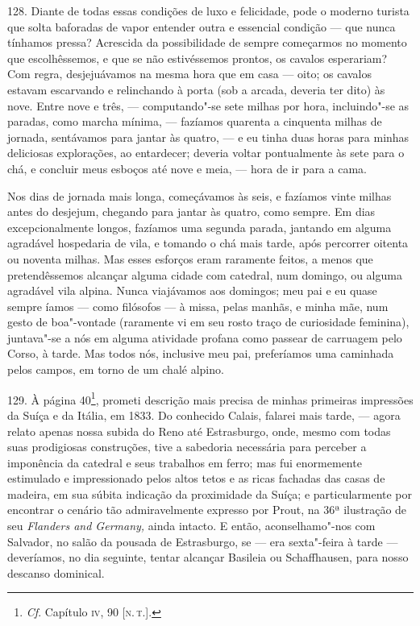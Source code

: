 128. Diante de todas essas condições de luxo e felicidade, pode o
moderno turista que solta baforadas de vapor entender outra e essencial
condição --- que nunca tínhamos pressa? Acrescida da possibilidade de
sempre começarmos no momento que escolhêssemos, e que se não
estivéssemos prontos, os cavalos esperariam? Com regra, desjejuávamos na
mesma hora que em casa --- oito; os cavalos estavam escarvando e
relinchando à porta (sob a arcada, deveria ter dito) às nove. Entre nove
e três, --- computando"-se sete milhas por hora, incluindo"-se as paradas,
como marcha mínima, --- fazíamos quarenta a cinquenta milhas de jornada,
sentávamos para jantar às quatro, --- e eu tinha duas horas para minhas
deliciosas explorações, ao entardecer; deveria voltar pontualmente às
sete para o chá, e concluir meus esboços até nove e meia, --- hora de ir
para a cama.

Nos dias de jornada mais longa, começávamos às seis, e fazíamos vinte
milhas antes do desjejum, chegando para jantar às quatro, como sempre.
Em dias excepcionalmente longos, fazíamos uma segunda parada, jantando
em alguma agradável hospedaria de vila, e tomando o chá mais tarde, após
percorrer oitenta ou noventa milhas. Mas esses esforços eram raramente
feitos, a menos que pretendêssemos alcançar alguma cidade com catedral,
num domingo, ou alguma agradável vila alpina. Nunca viajávamos aos
domingos; meu pai e eu quase sempre íamos --- como filósofos --- à missa,
pelas manhãs, e minha mãe, num gesto de boa"-vontade (raramente vi em seu
rosto traço de curiosidade feminina), juntava"-se a nós em alguma
atividade profana como passear de carruagem pelo Corso, à tarde. Mas
todos nós, inclusive meu pai, preferíamos uma caminhada pelos campos, em
torno de um chalé alpino.

129. À página 40\footnote{\emph{Cf}. Capítulo \textsc{iv}, 90 {[}\textsc{n.\,t.}{]}.},
prometi descrição mais precisa de minhas primeiras impressões da Suíça e
da Itália, em 1833. Do conhecido Calais, falarei mais tarde, --- agora
relato apenas nossa subida do Reno até Estrasburgo, onde, mesmo com
todas suas prodigiosas construções, tive a sabedoria necessária para
perceber a imponência da catedral e seus trabalhos em ferro; mas fui
enormemente estimulado e impressionado pelos altos tetos e as ricas
fachadas das casas de madeira, em sua súbita indicação da proximidade da
Suíça; e particularmente por encontrar o cenário tão admiravelmente
expresso por Prout, na 36ª ilustração de seu \emph{Flanders and
Germany,} ainda intacto. E então, aconselhamo"-nos com Salvador, no salão
da pousada de Estrasburgo, se --- era sexta"-feira à tarde --- deveríamos,
no dia seguinte, tentar alcançar Basileia ou Schaffhausen, para nosso
descanso dominical.

